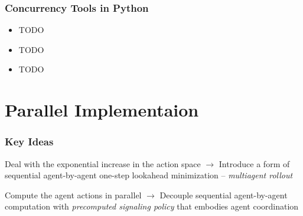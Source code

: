 \documentclass{beamer}
\begin{document}

\begin{frame}
	
	\frametitle{Concurrency Tools in Python}
    
    \begin{itemize}
		\item TODO
		\item TODO
		\item TODO
	\end{itemize}

\end{frame}









\section{Parallel Implementaion}



    \begin{frame}
        \frametitle{Key Ideas}


        \begin{block}{Deal with the exponential increase in the action space}
            $\rightarrow$ Introduce a form of sequential
            agent-by-agent one-step lookahead minimization --
            \textit{multiagent rollout}

        \end{block}

        \begin{block}{Compute the agent actions in parallel}
            $\rightarrow$ Decouple sequential
            agent-by-agent computation with \textit{precomputed
            signaling policy} that embodies agent coordination
        \end{block}


    \end{frame}


\end{document}
